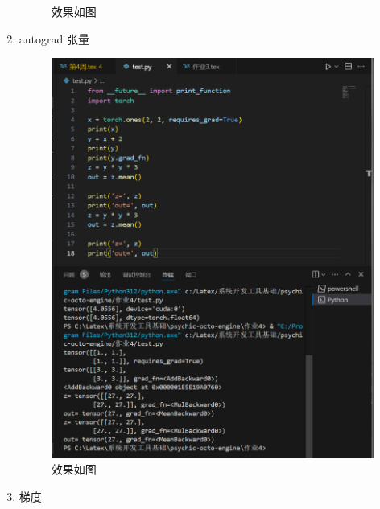 \documentclass{ctexart}
\begin{document}
\begin{enumerate}
\begin{figure}[H]
    \caption{效果如图}
    \label{fig:23}
    \end{figure}
    \item autograd 张量
    \begin{figure}[H]
    \centering
    \includegraphics[width=14cm]{a97225869c464ad9325103a09b31a3f8.png}
    \caption{效果如图}
    \label{fig:23}
    \end{figure}
    \item 梯度
    \begin{figure}[H]
    \centering

\end{figure}
\end{enumerate}
\end{document}
